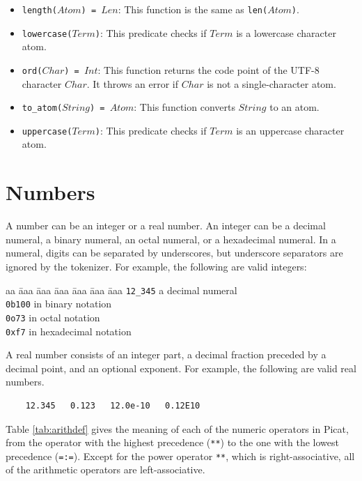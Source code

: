 \begin{itemize}
\item \texttt{length($Atom$) = $Len$}: This function is the same as \texttt{len($Atom$)}.
\item \texttt{lowercase($Term$)}: This predicate checks if $Term$ is a lowercase character atom.
\item \texttt{ord($Char$) = $Int$}: This function returns the code point of the UTF-8 character $Char$.  \newline It throws an error if $Char$ is not a single-character atom.
\item \texttt{to\_atom($String$) = $Atom$}: This function converts $String$ to an atom.
\item \texttt{uppercase($Term$)}: This predicate checks if $Term$ is an uppercase character atom.
\end{itemize}

\section{Numbers}
A number can be an integer or a real number. An integer can be a decimal numeral, a binary numeral, an octal numeral, or a hexadecimal numeral. In a numeral, digits can be separated by underscores, but underscore separators are ignored by the tokenizer. For example, the following are valid integers:
\begin{tabbing}
aa \= aaa \= aaa \= aaa \= aaa \= aaa \= aaa \kill
\> \texttt{12\_345} \> \> \> a decimal numeral \\
\> \texttt{0b100} \> \>  in binary notation  \\
\> \texttt{0o73} \> \>  in octal notation \\
\> \texttt{0xf7} \> \>  in hexadecimal notation  
\end{tabbing}

A real number consists of an integer part, a decimal fraction preceded by a decimal point, and an optional exponent. For example, the following are valid real numbers.
\begin{verbatim}
    12.345   0.123   12.0e-10   0.12E10
\end{verbatim}

Table \ref{tab:arithdef} gives the meaning of each of the numeric operators in Picat, from the operator with the highest precedence (\verb+**+) to the one with the lowest precedence (\verb+=:=+). Except for the power operator \verb+**+, which is right-associative, all of the arithmetic operators are left-associative. 

